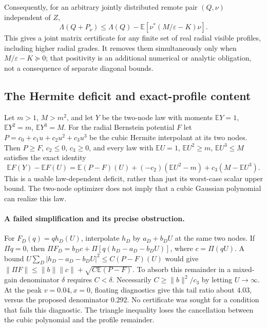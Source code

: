 Consequently, for an arbitrary jointly distributed remote pair $(Q,\nu)$ independent of $Z$,
\[
 \boxed{\Lambda(Q+P_\nu)\le\Lambda(Q)-
 \mathbb E[\nu^*(M/\varepsilon-K)\nu].}
\]
This gives a joint matrix certificate for any finite set of real radial visible profiles, including higher radial grades. It removes them simultaneously only when $M/\varepsilon-K\succeq0$; that positivity is an additional numerical or analytic obligation, not a consequence of separate diagonal bounds.

\subsection{The Hermite deficit and exact-profile content}
Let $m>1$, $M>m^2$, and let $Y$ be the two-node law with moments
$\mathbb EY=1$, $\mathbb EY^2=m$, $\mathbb EY^3=M$. For the radial
Bernstein potential $F$ let $P=c_0+c_1u+c_2u^2+c_3u^3$ be the cubic
Hermite interpolant at its two nodes. Then $P\ge F$, $c_2\le0$, $c_3\ge0$,
and every law with $\mathbb EU=1$, $\mathbb EU^2\ge m$, $\mathbb EU^3\le M$
satisfies the exact identity
\[
 \mathbb EF(Y)-\mathbb EF(U)=\mathbb E(P-F)(U)
 +(-c_2)(\mathbb EU^2-m)+c_3(M-\mathbb EU^3).
\]
This is a usable law-dependent deficit, rather than just its worst-case
scalar upper bound. The two-node optimizer does not imply that a cubic
Gaussian polynomial can realize this law.

\paragraph{A failed simplification and its precise obstruction.}
For $F_D(q)=q h_D(U)$, interpolate $h_D$ by $a_D+b_DU$ at the same two
nodes. If $\Pi q=0$, then
$\Pi F_D=b_Dc+\Pi[q(h_D-a_D-b_DU)]$, where $c=\Pi(qU)$.
A bound $U\sum_D|h_D-a_D-b_DU|^2\le C(P-F)(U)$ would give
$\|\Pi F\|\le\|b\|\|c\|+\sqrt{C\mathbb E(P-F)}$.
To absorb this remainder in a mixed-gain denominator $\delta$ requires
$C<\delta$. Necessarily $C\ge\|b\|^2/c_3$ by letting $U\to\infty$.
At the peak $v=0.04,x=0$, floating diagnostics give this tail ratio about
$4.03$, versus the proposed denominator $0.292$. No certificate was sought
for a condition that fails this diagnostic. The triangle inequality loses
the cancellation between the cubic polynomial and the profile remainder.

